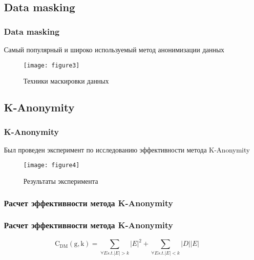 \documentclass[handout]{beamer}
\begin{document}
\subsection{Data masking}
\begin{frame}
    \frametitle{Data masking}

    Самый популярный и широко используемый метод анонимизации данных

    \begin{figure}[ht!]
       \texttt{[image: figure3]}
       \caption{Техники маскировки данных}
       \label{fig:3}
   \end{figure}
\end{frame}

\subsection{K-Anonymity}
\begin{frame}
    \frametitle{K-Anonymity}

    Был проведен \alert{эксперимент} по исследованию эффективности метода K-Anonymity

    \begin{figure}[ht!]
       \texttt{[image: figure4]}
       \caption{Результаты эксперимента}
       \label{fig:4}
   \end{figure}
\end{frame}

\subsubsection{Расчет эффективности метода K-Anonymity}
\begin{frame}
    \frametitle{Расчет эффективности метода K-Anonymity}

     $$
        \mathrm{C_{DM}(g,k)} = \sum_{\forall E s.t. \left | E \right | > k}
        \left | E \right |^2 + \sum_{\forall E s.t. \left | E \right | < k}
        \left |D \right | \left | E \right |
    $$
\end{frame}
\end{document}
